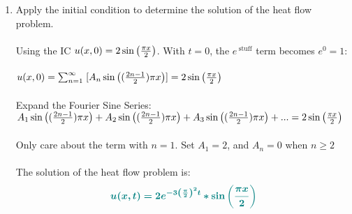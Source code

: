 \documentclass{article}
\begin{document}
\begin{enumerate}
\begin{enumerate}
\item Apply the initial condition to determine the solution of the heat flow problem.\\\\
Using the IC $u(x,0)=2\sin\left({\pi x\over2}\right)$. With $t=0$, the $e\,^{\text{stuff}}$ term becomes $e^0 = 1$:\\\\
$u(x,0) = \sum_{n=1}^{\infty} \;[ A_n \sin\left(({2n-1\over2})\pi x\right)] = 2\sin\left({\pi x\over2}\right)$\\\\
Expand the Fourier Sine Series:\\
$A_1 \sin\left(({2n-1\over2})\pi x\right) + A_2 \sin\left(({2n-1\over2})\pi x\right) + A_3 \sin\left(({2n-1\over2})\pi x\right) +...= 2\sin\left({\pi x\over2}\right)$\\\\
Only care about the term with $n=1$. Set $A_1=2$, and $A_n = 0$ when $n\geq2$\\\\
The solution of the heat flow problem is:
\[
\textcolor{teal}{\bm{u(x,t) = 2e\sp{-3\left({\pi\over2}\right)^2 t} * \sin\left({\pi x\over 2}\right)}}
\]


\end{enumerate}


\end{enumerate}
\end{document}
